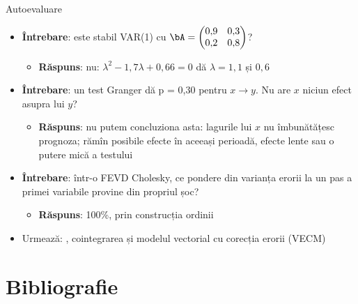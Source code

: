 \begin{frame}{Autoevaluare}
\itemsize{\small}
\begin{itemize}
    \item \textbf{Întrebare}: este stabil VAR(1) cu $\bA = \begin{pmatrix} 0{,}9 & 0{,}3 \\ 0{,}2 & 0{,}8 \end{pmatrix}$?
    \begin{itemize}
        \item \textbf{Răspuns}: nu: $\lambda^2 - 1{,}7\lambda + 0{,}66 = 0$ dă $\lambda = 1{,}1$ și $0{,}6$
    \end{itemize}
    \item \textbf{Întrebare}: un test Granger dă p = 0,30 pentru $x \to y$. Nu are $x$ niciun efect asupra lui $y$?
    \begin{itemize}
        \item \textbf{Răspuns}: nu putem concluziona asta: lagurile lui $x$ nu îmbunătățesc prognoza; rămîn posibile efecte în aceeași perioadă, efecte lente sau o putere mică a testului
    \end{itemize}
    \item \textbf{Întrebare}: într-o FEVD Cholesky, ce pondere din varianța erorii la un pas a primei variabile provine din propriul șoc?
    \begin{itemize}
        \item \textbf{Răspuns}: 100\%, prin construcția ordinii
    \end{itemize}
    \item Urmează: , cointegrarea și modelul vectorial cu corecția erorii (VECM)
\end{itemize}
\end{frame}


\section{Bibliografie}

